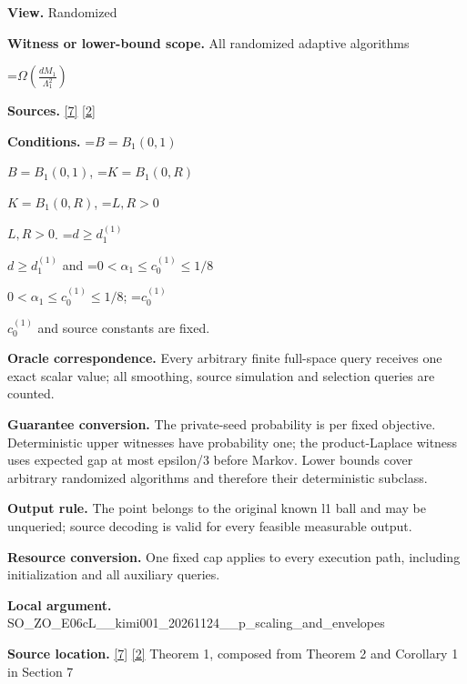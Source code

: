 \documentclass[10pt,a4paper]{article}
\newcommand{\AtlasMath}[1]{\par\begingroup\centering\setbox0=\hbox{$\displaystyle #1$}\ifdim\wd0>1.4\linewidth\typeout{ATLAS WIDE FORMULA: \the\wd0}\fi\ifdim\wd0>\linewidth\resizebox{\linewidth}{!}{\box0}\else\box0\fi\par\endgroup}
\newcommand{\AtlasInlineMath}[1]{\begingroup\setbox0=\hbox{$#1$}\ifdim\wd0>.4\linewidth\endgroup\AtlasMath{#1}\else\endgroup$#1$\fi}
\begin{document}
\textbf{View.} Randomized



\textbf{Witness or lower-bound scope.} All randomized adaptive algorithms



\AtlasMath{\Omega\!\left(\frac{dM_1}{\Lambda_1^2}\right)}


\textbf{Sources.} \href{https://github.com/WU-Wendao/Colombo/blob/main/colombo_sensorium/Complexity_altas/data/sources/colombo/COLOMBO_KIMI_001/kimi_001.pdf}{[7]} \href{https://arxiv.org/html/2607.16558v2}{[2]}



\textbf{Conditions.} \AtlasInlineMath{B=B_1(0,1)}, \AtlasInlineMath{K=B_1(0,R)}, \AtlasInlineMath{L,R>0}. \AtlasInlineMath{d\ge d_1^{(1)}} and \AtlasInlineMath{0<\alpha_1\le c_0^{(1)}\le1/8}; \AtlasInlineMath{c_0^{(1)}} and source constants are fixed.



\textbf{Oracle correspondence.} Every arbitrary finite full-space query receives one exact scalar value; all smoothing, source simulation and selection queries are counted.



\textbf{Guarantee conversion.} The private-seed probability is per fixed objective. Deterministic upper witnesses have probability one; the product-Laplace witness uses expected gap at most epsilon/3 before Markov. Lower bounds cover arbitrary randomized algorithms and therefore their deterministic subclass.



\textbf{Output rule.} The point belongs to the original known l1 ball and may be unqueried; source decoding is valid for every feasible measurable output.



\textbf{Resource conversion.} One fixed cap applies to every execution path, including initialization and all auxiliary queries.



\textbf{Local argument.} SO\_ZO\_E06cL\_\_kimi001\_202\allowbreak{}61124\_\_p\_scaling\_and\_env\allowbreak{}elopes



\textbf{Source location.} \href{https://github.com/WU-Wendao/Colombo/blob/main/colombo_sensorium/Complexity_altas/data/sources/colombo/COLOMBO_KIMI_001/kimi_001.pdf}{[7]} \href{https://arxiv.org/html/2607.16558v2}{[2]} Theorem 1, composed from Theorem 2 and Corollary 1 in Section 7
\end{document}
